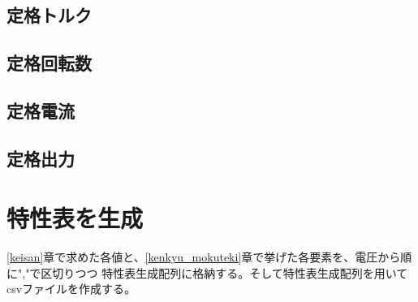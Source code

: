 


\subsection{定格トルク}\label{sub:keisan_teikakutoruku}



\subsection{定格回転数}\label{sub:keisan_teikakukaiten}




\subsection{定格電流}\label{sub:keisan_teikakuden}


\subsection{定格出力}\label{sub:keisan_teikakusyutu}


\section{特性表を生成}\label{seisei_hyou}
\ref{keisan}章で求めた各値と、\ref{kenkyu_mokuteki}章で挙げた各要素を、電圧から順に","で区切りつつ
特性表生成配列に格納する。そして特性表生成配列を用いてcsvファイルを作成する。

